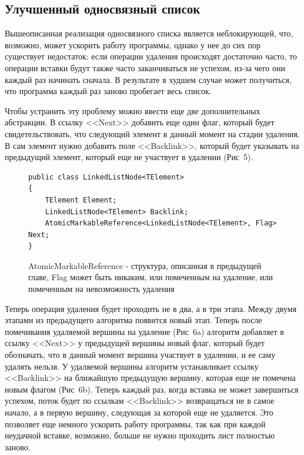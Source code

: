\documentclass[12pt]{article}
\begin{document}
{			\subsection{Улучшенный односвязный список}
				\par Вышеописанная реализация односвязного списка является неблокирующей, что, возможно, может ускорить работу программы, однако у нее до сих пор существует недостаток: если операции удаления происходят достаточно часто, то операции вставки будут также часто заканчиваться не успехом, из-за чего они каждый раз начинать сначала. В результате в худшем случае может получиться, что программа каждый раз заново пробегает весь список.
				\par Чтобы устранить эту проблему можно ввести еще две дополнительных абстракции. В ссылку <<Next>> добавить еще один флаг, который будет свидетельствовать, что следующий элемент в данный момент на стадии удаления. В сам элемент нужно добавить поле <<Backlink>>, который будет указывать на предыдущий элемент, который еще не участвует в удалении (Рис~5). 
				\begin{figure}[h]
					\begin{lstlisting}
public class LinkedListNode<TElement>
{
	TElement Element;
	LinkedListNode<TElement> Backlink;
	AtomicMarkableReference<LinkedListNode<TElement>, Flag> Next;
}
					\end{lstlisting}
					\caption{AtomicMarkableReference - структура, описанная в предыдущей главе, Flag может быть никаким, или помеченным на удаление, или помеченным на невозможность удаления}
				\end{figure}
				Теперь операция удаления будет проходить не в два, а в три этапа. Между двумя этапами из предыдущего алгоритма появится новый этап. Теперь после помечивания удаляемой вершины на удаление (Рис~6a) алгоритм добавляет в ссылку <<Next>> у предыдущей вершины новый флаг, который будет обозначать, что в данный момент вершина участвует в удалении, и ее саму удалять нельзя. У удаляемой вершины алгоритм устанавливает ссылку <<Backlink>> на ближайшую предыдущую вершину, которая еще не помечена новым флагом (Рис~6b). Теперь каждый раз, когда вставка не может завершиться успехом, поток будет по ссылкам <<Backlink>> возвращаться не в самое начало, а в первую вершину, следующая за которой еще не удаляется. Это позволяет еще немного ускорить работу программы, так как при каждой неудачной вставке, возможно, больше не нужно проходить лист полностью заново.
				\begin{figure}[h]
					\begin{minipage}[h]{0.45\linewidth}

\end{minipage}
\end{figure}}
\end{document}
